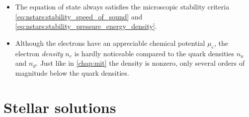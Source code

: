 \begin{itemize}
\item The equation of state always satisfies the microscopic stability criteria \eqref{eq:nstars:stability_speed_of_sound} and \eqref{eq:nstars:stability_pressure_energy_density}.
\item Although the electrons have an appreciable chemical potential $\mu_e$, the electron \emph{density} $n_e$ is hardly noticeable compared to the quark densities $n_u$ and $n_d$.
      Just like in \cref{chap:mit} the density is nonzero, only several orders of magnitude below the quark densities.
\end{itemize}


\section{Stellar solutions}

